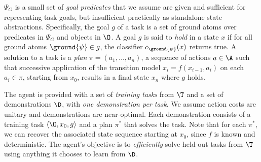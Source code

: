 $\Psi_G$ is a small set of \emph{goal predicates} that we assume are given and sufficient for representing task goals, but insufficient practically as standalone state abstractions. Specifically, the goal $g$ of a task is a set of ground atoms over predicates in $\Psi_G$ and objects in $\O$.
A goal $g$ is said to \emph{hold} in a state $x$ if for all ground atoms $\ground{\psi} \in g$, the classifier $c_{\ground{\psi}}(x)$ returns true.
A solution to a task is a \emph{plan} $\pi = (a_1, \ldots, a_n)$, a sequence of actions $a \in \A$ such that successive application of the transition model $x_i = f(x_{i-1}, a_i)$ on each $a_i \in \pi$, starting from $x_0$, results in a final state $x_n$ where $g$ holds.

The agent is provided with a set of \emph{training tasks} from $\T$ and a set of demonstrations $\D$, with \emph{one demonstration per task}.
We assume action costs are unitary and demonstrations are near-optimal.
Each demonstration consists of a training task $\langle \O, x_0, g \rangle$ and a plan $\pi^*$ that solves the task.
Note that for each $\pi^*$, we can recover the associated state sequence starting at $x_0$, since $f$ is known and deterministic.
The agent's objective is to \emph{efficiently} solve held-out tasks from $\T$ using anything it chooses to learn from $\D$.
